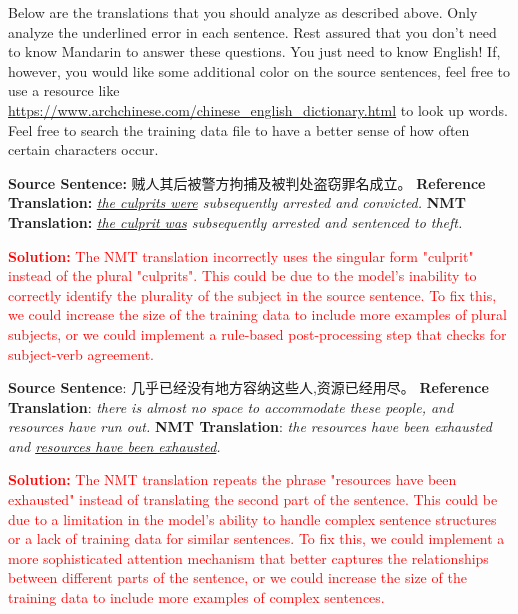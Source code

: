 \begin{parts}
    Below are the translations that you should analyze as described above. Only analyze the underlined error in each sentence. Rest assured that you don't need to know Mandarin to answer these questions. You just need to know English! If, however, you would like some additional color on the source sentences, feel free to use a resource like \url{https://www.archchinese.com/chinese_english_dictionary.html} to look up words. Feel free to search the training data file to have a better sense of how often certain characters occur.

    \begin{subparts}
        \subpart[2]
        \textbf{Source Sentence:} 贼人其后被警方拘捕及被判处盗窃罪名成立。 \newline
        \textbf{Reference Translation:} \textit{\underline{the culprits were} subsequently arrested and convicted.}\newline
        \textbf{NMT Translation:} \textit{\underline{the culprit was} subsequently arrested and sentenced to theft.}

        \textcolor{red}{\textbf{Solution: } The NMT translation incorrectly uses the singular form "culprit" instead of the plural "culprits". This could be due to the model's inability to correctly identify the plurality of the subject in the source sentence. To fix this, we could increase the size of the training data to include more examples of plural subjects, or we could implement a rule-based post-processing step that checks for subject-verb agreement.}
        

        \subpart[2]
        \textbf{Source Sentence}: 几乎已经没有地方容纳这些人,资源已经用尽。\newline
        \textbf{Reference Translation}: \textit{there is almost no space to accommodate these people, and resources have run out.   }\newline
        \textbf{NMT Translation}: \textit{the resources have been exhausted and \underline{resources have been exhausted}.}
        
        \textcolor{red}{\textbf{Solution: } The NMT translation repeats the phrase "resources have been exhausted" instead of translating the second part of the sentence. This could be due to a limitation in the model's ability to handle complex sentence structures or a lack of training data for similar sentences. To fix this, we could implement a more sophisticated attention mechanism that better captures the relationships between different parts of the sentence, or we could increase the size of the training data to include more examples of complex sentences.}
        


\end{subparts}
\end{parts}
